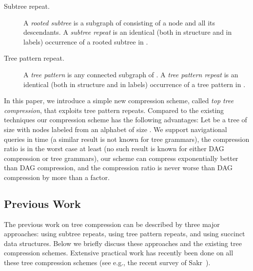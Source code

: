 \documentclass [11pt]{article}
\begin{document}
\begin{description}
\item[Subtree repeat.] A \emph{rooted subtree} is a subgraph of  consisting of a node and all its descendants. A \emph{subtree repeat} is an identical (both in structure and in labels) occurrence of a rooted subtree in . 

\item[Tree pattern repeat.] A  \emph{tree pattern} is any connected subgraph of . A  \emph{tree pattern repeat} is an identical (both in structure and in labels) occurrence of a tree pattern in .
\end{description}


In this paper, we introduce a simple new compression scheme, called \emph{top tree compression}, that exploits tree pattern repeats. Compared to the existing techniques our compression scheme has the following advantages: Let  be a tree of size  with nodes labeled from an alphabet of size . We support navigational queries in  time (a similar result is not known for tree grammars), the compression ratio is in the worst case at least  (no such result is known for either DAG compression or tree grammars), our scheme can compress exponentially better than DAG compression, and the compression ratio is never worse than DAG compression by more than a  factor.


\subsection{Previous Work}
The previous work on tree compression can be described by three major approaches: using subtree repeats, using tree pattern repeats, and using succinct data structures.  Below we briefly discuss these approaches and the existing  tree compression schemes. 
Extensive practical work has recently been done on all these tree compression schemes (see e.g., the recent survey of Sakr~\cite{sakr2009xml}).
\end{document}
